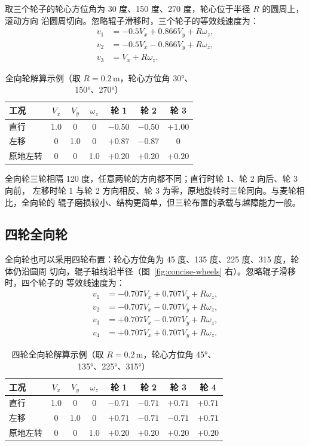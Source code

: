 取三个轮子的轮心方位角为 30 度、150 度、270 度，轮心位于半径 $R$ 的圆周上，滚动方向
沿圆周切向。忽略辊子滑移时，三个轮子的等效线速度为：
\[
\begin{aligned}
v_1 &= -0.5V_x + 0.866V_y + R\omega_z,\\
v_2 &= -0.5V_x - 0.866V_y + R\omega_z,\\
v_3 &= V_x + R\omega_z.
\end{aligned}
\]

\begin{table}[htbp]
  \centering
  \small
  \setlength{\tabcolsep}{5pt}
  \begin{tabular}{@{}lcccccc@{}}
    \toprule
    工况 & $V_x$ & $V_y$ & $\omega_z$ & 轮 1 & 轮 2 & 轮 3 \\
    \midrule
    直行 & 1.0 & 0 & 0 & $-0.50$ & $-0.50$ & $+1.00$ \\
    左移 & 0 & 1.0 & 0 & $+0.87$ & $-0.87$ & $0$ \\
    原地左转 & 0 & 0 & 1.0 & $+0.20$ & $+0.20$ & $+0.20$ \\
    \bottomrule
  \end{tabular}
  \caption{全向轮解算示例（取 $R=0.2$\,m，轮心方位角 30°、150°、270°）}
  \label{tab:concise-omni}
\end{table}

全向轮三轮相隔 120 度，任意两轮的方向都不同；直行时轮 1、轮 2 向后、轮 3 向前，
左移时轮 1 与轮 2 方向相反、轮 3 为零，原地旋转时三轮同向。与麦轮相比，全向轮的
辊子磨损较小、结构更简单，但三轮布置的承载与越障能力一般。

\subsection{四轮全向轮}

全向轮也可以采用四轮布置：轮心方位角为 45 度、135 度、225 度、315 度，轮体仍沿圆周
切向，辊子轴线沿半径（图~\ref{fig:concise-wheels} 右）。忽略辊子滑移时，四个轮子的
等效线速度为：
\[
\begin{aligned}
v_1 &= -0.707V_x + 0.707V_y + R\omega_z,\\
v_2 &= -0.707V_x - 0.707V_y + R\omega_z,\\
v_3 &= +0.707V_x - 0.707V_y + R\omega_z,\\
v_4 &= +0.707V_x + 0.707V_y + R\omega_z.
\end{aligned}
\]

\begin{table}[htbp]
  \centering
  \small
  \setlength{\tabcolsep}{5pt}
  \begin{tabular}{@{}lccccccc@{}}
    \toprule
    工况 & $V_x$ & $V_y$ & $\omega_z$ & 轮 1 & 轮 2 & 轮 3 & 轮 4 \\
    \midrule
    直行 & 1.0 & 0 & 0 & $-0.71$ & $-0.71$ & $+0.71$ & $+0.71$ \\
    左移 & 0 & 1.0 & 0 & $+0.71$ & $-0.71$ & $-0.71$ & $+0.71$ \\
    原地左转 & 0 & 0 & 1.0 & $+0.20$ & $+0.20$ & $+0.20$ & $+0.20$ \\
    \bottomrule
  \end{tabular}
  \caption{四轮全向轮解算示例（取 $R=0.2$\,m，轮心方位角 45°、135°、225°、315°）}
  \label{tab:concise-omni4}
\end{table}

